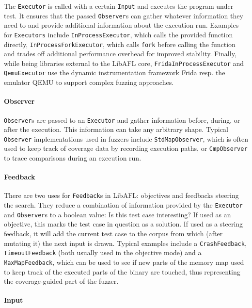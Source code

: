 \documentclass{article}
\newcommand{\code}[1]{\texttt{#1}}
\begin{document}
\begin{multicols}{2}
    The \code{Executor} is called with a certain \code{Input} and executes the program under test. It ensures that the passed \code{Observer}s can gather whatever information they need to and provide additional information about the execution run. Examples for \code{Executors} include \code{InProcessExecutor}, which calls the provided function directly, \code{InProcessForkExecutor}, which calls \code{fork} before calling the function and trades off additional performance overhead for improved stability. Finally, while being libraries external to the LibAFL core, \code{FridaInProcessExecutor} and \code{QemuExecutor} use the dynamic instrumentation framework Frida resp. the emulator QEMU to support complex fuzzing approaches.

    \paragraph{Observer}

    \code{Observer}s are passed to an \code{Executor} and gather information before, during, or after the execution. This information can take any arbitrary shape. Typical \code{Observer} implementations used in fuzzers include \code{StdMapObserver}, which is often used to keep track of coverage data by recording execution paths, or \code{CmpObserver} to trace comparisons during an execution run.

    \paragraph{Feedback}

    There are two uses for \code{Feedback}s in LibAFL: objectives and feedbacks steering the search. They reduce a combination of information provided by the \code{Executor} and \code{Observer}s to a boolean value: Is this test case interesting? If used as an objective, this marks the test case in question as a solution. If used as a steering feedback, it will add the current test case to the corpus from which (after mutating it) the next input is drawn. Typical examples include a \code{CrashFeedback}, \code{TimeoutFeedback} (both usually used in the objective mode) and a \code{MaxMapFeedback}, which can be used to see if new parts of the memory map used to keep track of the executed parts of the binary are touched, thus representing the coverage-guided part of the fuzzer.

    \paragraph{Input}


\end{multicols}
\end{document}
